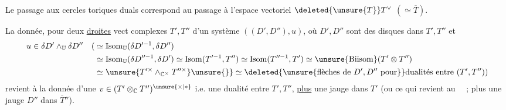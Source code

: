 



Le passage aux cercles toriques  duals correspond au passage
à l'espace vectoriel 
 $\deleted{\unsure{T}}T^{\vee}$ $(\simeq\overline T)$.

La donnée, pour deux \uline{droites} vect complexes $T',T''$
d'un système $((D',D''),u)$, où $D',D''$ sont des
disques dans $T',T''$ et
\[
\begin{aligned}
u\in\delta D'\wedge_{\mathbb U}\delta D''\quad
(&\simeq\operatorname{Isom}_{\mathbb U}(\delta D'^{-1},\delta D'')\\
&\simeq\operatorname{Isom}_{\mathbb U}(\delta D''^{-1},\delta D')
\simeq\operatorname{Isom}(T'^{-1},T'')
\simeq\operatorname{Isom}(T''^{-1},T')
\simeq\unsure{\operatorname{Biisom}}(T'\otimes T'')\\
&\simeq\unsure{T'^{\times}\wedge_{\mathbb C^{\times}}T''^{\times}}
\unsure{\}}\simeq\deleted{\unsure{\text{flèches de }D',D''\ \text{pour}}}
\text{dualités entre }(T',T''))
\end{aligned}
\]
revient à la donnée d'une $v\in(T'\otimes_{\mathbb C}T'')^{\unsure{\times|*}}$
i.e. une dualité entre $T',T''$, \uline{plus} une jauge  dans $T'$
(ou ce qui revient au \ \ ; plus une jauge
$D''$ dans $\overline T''$).
